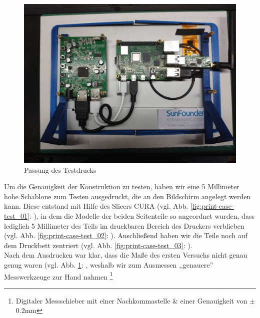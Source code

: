 \begin{figure}[H]
	\includegraphics[width=1\textwidth]{img/testdruck_an_bildschirm.jpg}
	\caption[Passung des Testdrucks]{Passung des Testdrucks}
	\label{fig:print-case-test_04}
\end{figure}
\noindent Um die Genauigkeit der Konstruktion zu testen, haben wir eine 5 Millimeter hohe Schablone zum Testen ausgedruckt, die an den Bildschirm angelegt werden kann. 
Diese entstand mit Hilfe des Slicers CURA (vgl. Abb. \ref{fig:print-case-test_01}: ), in dem die Modelle der beiden Seitenteile so angeordnet wurden, dass lediglich 5 Millimeter des Teils im druckbaren Bereich des Druckers verblieben (vgl. Abb. \ref{fig:print-case-test_02}: ). Anschließend haben wir die Teile noch auf dem Druckbett zentriert (vgl. Abb. \ref{fig:print-case-test_03}: ).\\
\noindent Nach dem Ausdrucken war klar, dass die Maße des ersten Versuchs nicht genau genug waren (vgl. Abb. \ref{fig:print-case-test_04}: , weshalb wir zum Ausmessen ,,genauere'' Messwerkzeuge zur Hand nahmen \footnote{Digitaler Messschieber mit einer Nachkommastelle \& einer  Genauigkeit von $\pm$ 0.2mm}